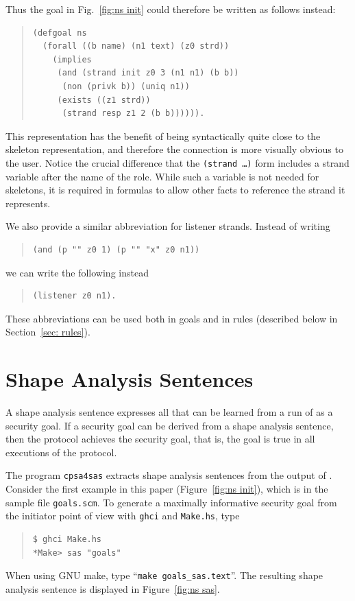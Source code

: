 Thus the goal in Fig.~\ref{fig:ns init} could therefore be written as
follows instead:

\begin{quote}
\begin{verbatim}
(defgoal ns
  (forall ((b name) (n1 text) (z0 strd))
    (implies
     (and (strand init z0 3 (n1 n1) (b b))
      (non (privk b)) (uniq n1))
     (exists ((z1 strd))
      (strand resp z1 2 (b b)))))).
\end{verbatim}
\end{quote}

This representation has the benefit of being syntactically quite close
to the skeleton representation, and therefore the connection is more
visually obvious to the user. Notice the crucial difference that the
\texttt{(strand  \ldots)} form includes a strand variable
after the name of the role. While such a variable is not needed for
skeletons, it is required in formulas to allow other facts to
reference the strand it represents.

We also provide a similar abbreviation for listener strands. Instead
of writing

\begin{quote}
\begin{verbatim}
(and (p "" z0 1) (p "" "x" z0 n1))
\end{verbatim}
\end{quote}
we can write the following instead
\begin{quote}
\begin{verbatim}
(listener z0 n1).
\end{verbatim}
\end{quote}

These abbreviations can be used both in goals and in rules (described
below in Section~\ref{sec: rules}).

\section{Shape Analysis Sentences}\label{sec:sas}

A shape analysis sentence expresses all that can be learned from a run
of {\cpsa} as a security goal.  If a security goal can be derived from
a shape analysis sentence, then the protocol achieves the security
goal, that is, the goal is true in all executions of the protocol.

The program \texttt{cpsa4sas} extracts shape analysis sentences from
the output of {\cpsa}.  Consider the first example in this paper
(Figure~\ref{fig:ns init}), which is in the sample file
\texttt{goals.scm}.  To generate a maximally informative security goal
from the initiator point of view with \texttt{ghci} and
\texttt{Make.hs}, type
\begin{quote}
\begin{verbatim}
$ ghci Make.hs
*Make> sas "goals"
\end{verbatim}
\end{quote}
When using GNU make, type ``\texttt{make goals\_sas.text}''.  The
resulting shape analysis sentence is displayed in Figure~\ref{fig:ns
  sas}. 

